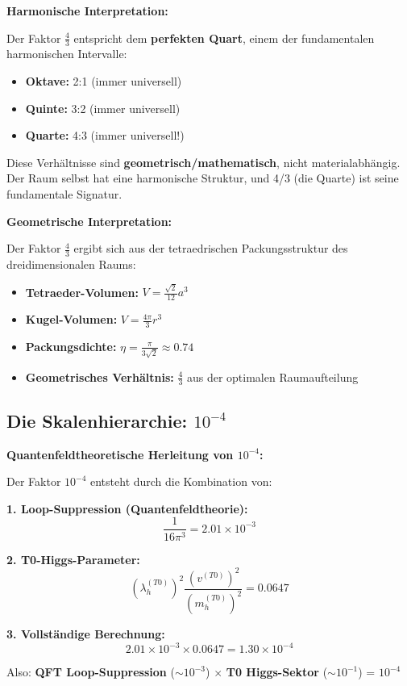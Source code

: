 \documentclass[12pt,a4paper]{article}
\begin{document}
	\begin{alternative}
		\textbf{Harmonische Interpretation:}
		
		Der Faktor $\frac{4}{3}$ entspricht dem \textbf{perfekten Quart}, einem der fundamentalen harmonischen Intervalle:
		\begin{itemize}
			\item \textbf{Oktave:} 2:1 (immer universell)
			\item \textbf{Quinte:} 3:2 (immer universell)  
			\item \textbf{Quarte:} 4:3 (immer universell!)
		\end{itemize}
		
		Diese Verhältnisse sind \textbf{geometrisch/mathematisch}, nicht materialabhängig. Der Raum selbst hat eine harmonische Struktur, und 4/3 (die Quarte) ist seine fundamentale Signatur.
	\end{alternative}
	
	\begin{alternative}
		\textbf{Geometrische Interpretation:}
		
		Der Faktor $\frac{4}{3}$ ergibt sich aus der tetraedrischen Packungsstruktur des dreidimensionalen Raums:
		\begin{itemize}
			\item \textbf{Tetraeder-Volumen:} $V = \frac{\sqrt{2}}{12}a^3$
			\item \textbf{Kugel-Volumen:} $V = \frac{4\pi}{3}r^3$ 
			\item \textbf{Packungsdichte:} $\eta = \frac{\pi}{3\sqrt{2}} \approx 0.74$
			\item \textbf{Geometrisches Verhältnis:} $\frac{4}{3}$ aus der optimalen Raumaufteilung
		\end{itemize}
	\end{alternative}
	
	\subsection{Die Skalenhierarchie: $10^{-4}$}
	
	\begin{foundation}
		\textbf{Quantenfeldtheoretische Herleitung von $10^{-4}$:}
		
		Der Faktor $10^{-4}$ entsteht durch die Kombination von:
		
		\textbf{1. Loop-Suppression (Quantenfeldtheorie):}
		\begin{equation}
			\frac{1}{16\pi^3} = 2.01 \times 10^{-3}
		\end{equation}
		
		\textbf{2. T0-Higgs-Parameter:}
		\begin{equation}
			(\lambda_h^{(T0)})^2 \frac{(v^{(T0)})^2}{(m_h^{(T0)})^2} = 0.0647
		\end{equation}
		
		\textbf{3. Vollständige Berechnung:}
		\begin{equation}
			2.01 \times 10^{-3} \times 0.0647 = 1.30 \times 10^{-4}
		\end{equation}
		
		Also: \textbf{QFT Loop-Suppression} ($\sim 10^{-3}$) $\times$ \textbf{T0 Higgs-Sektor} ($\sim 10^{-1}$) = $10^{-4}$
	\end{foundation}
	
\end{document}
